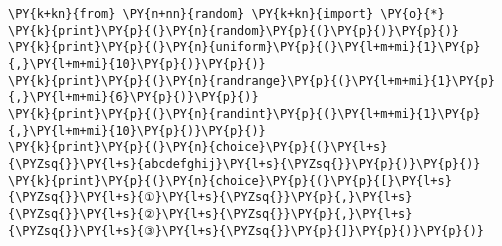 \begin{Verbatim}[commandchars=\\\{\}]
\PY{k+kn}{from} \PY{n+nn}{random} \PY{k+kn}{import} \PY{o}{*}
\PY{k}{print}\PY{p}{(}\PY{n}{random}\PY{p}{(}\PY{p}{)}\PY{p}{)}
\PY{k}{print}\PY{p}{(}\PY{n}{uniform}\PY{p}{(}\PY{l+m+mi}{1}\PY{p}{,}\PY{l+m+mi}{10}\PY{p}{)}\PY{p}{)}
\PY{k}{print}\PY{p}{(}\PY{n}{randrange}\PY{p}{(}\PY{l+m+mi}{1}\PY{p}{,}\PY{l+m+mi}{6}\PY{p}{)}\PY{p}{)}
\PY{k}{print}\PY{p}{(}\PY{n}{randint}\PY{p}{(}\PY{l+m+mi}{1}\PY{p}{,}\PY{l+m+mi}{10}\PY{p}{)}\PY{p}{)}
\PY{k}{print}\PY{p}{(}\PY{n}{choice}\PY{p}{(}\PY{l+s}{\PYZsq{}}\PY{l+s}{abcdefghij}\PY{l+s}{\PYZsq{}}\PY{p}{)}\PY{p}{)}
\PY{k}{print}\PY{p}{(}\PY{n}{choice}\PY{p}{(}\PY{p}{[}\PY{l+s}{\PYZsq{}}\PY{l+s}{①}\PY{l+s}{\PYZsq{}}\PY{p}{,}\PY{l+s}{\PYZsq{}}\PY{l+s}{②}\PY{l+s}{\PYZsq{}}\PY{p}{,}\PY{l+s}{\PYZsq{}}\PY{l+s}{③}\PY{l+s}{\PYZsq{}}\PY{p}{]}\PY{p}{)}\PY{p}{)}
\end{Verbatim}
